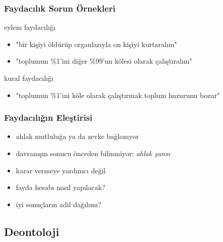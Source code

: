 \documentclass[dvipsnames]{beamer}
\theoremstyle{plain}
\begin{document}
\begin{frame}
  \frametitle{Faydacılık Sorun Örnekleri}

  \begin{exampleblock}{eylem faydacılığı}
    \begin{itemize}
      \item "bir kişiyi öldürüp organlarıyla on kişiyi kurtaralım"
      \item "toplumun \%1'ini diğer \%99'un kölesi olarak çalıştıralım"
    \end{itemize}
  \end{exampleblock}

  \pause
  \begin{exampleblock}{kural faydacılığı}
    \begin{itemize}
      \item "toplumun \%1'ini köle olarak çalıştırmak toplum huzurunu bozar"
    \end{itemize}
  \end{exampleblock}
\end{frame}

\begin{frame}
  \frametitle{Faydacılığın Eleştirisi}

  \begin{itemize}
    \item ahlak mutluluğa ya da zevke bağlanıyor

    \pause
    \medskip
    \item davranışın sonucu önceden bilinmiyor: \emph{ahlak şansı}

    \pause
    \medskip
    \item karar vermeye yardımcı değil
    \item fayda hesabı nasıl yapılacak?

    \pause
    \medskip
    \item iyi sonuçların adil dağılımı?
  \end{itemize}
\end{frame}

\subsection{Deontoloji}
\end{document}
